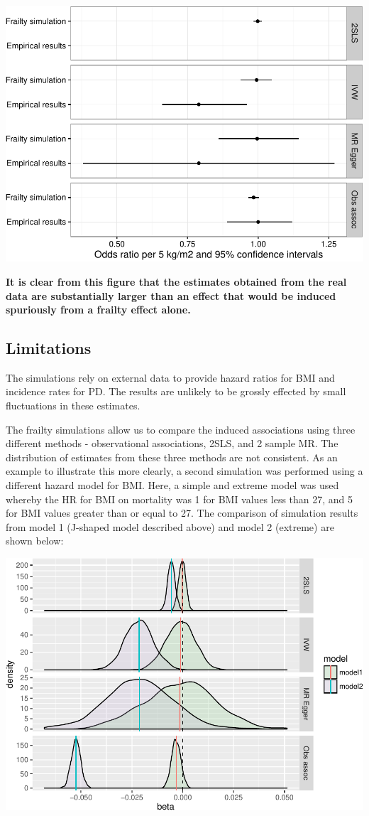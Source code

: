 \documentclass[]{article}
\begin{document}
\includegraphics{images/empirical_results-1.pdf}

\textbf{It is clear from this figure that the estimates obtained from
the real data are substantially larger than an effect that would be
induced spuriously from a frailty effect alone.}

\subsection{Limitations}\label{limitations}

The simulations rely on external data to provide hazard ratios for BMI
and incidence rates for PD. The results are unlikely to be grossly
effected by small fluctuations in these estimates.

The frailty simulations allow us to compare the induced associations
using three different methods - observational associations, 2SLS, and 2
sample MR. The distribution of estimates from these three methods are
not consistent. As an example to illustrate this more clearly, a second
simulation was performed using a different hazard model for BMI. Here, a
simple and extreme model was used whereby the HR for BMI on mortality
was 1 for BMI values less than 27, and 5 for BMI values greater than or
equal to 27. The comparison of simulation results from model 1 (J-shaped
model described above) and model 2 (extreme) are shown below:

\includegraphics{images/method_comparisons-1.pdf}
\end{document}
